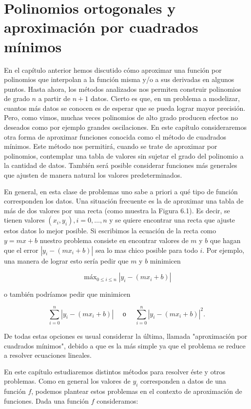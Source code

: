 \documentclass[10pt]{book}
\begin{document}
\chapter{Polinomios ortogonales y aproximación por cuadrados mínimos}
En el capítulo anterior hemos discutido cómo aproximar una función por polinomios que interpolan a la función misma y/o a sus derivadas en algunos puntos. Hasta ahora, los métodos analizados nos permiten construir polinomios de grado $n$ a partir de $n+1$ datos. Cierto es que, en un problema a modelizar, cuantos más datos se conocen es de esperar que se pueda lograr mayor precisión. Pero, como vimos, muchas veces polinomios de alto grado producen efectos no deseados como por ejemplo grandes oscilaciones. En este capítulo consideraremos otra forma de aproximar funciones conocida como el método de cuadrados mínimos. Este método nos permitirá, cuando se trate de aproximar por polinomios, contemplar una tabla de valores sin sujetar el grado del polinomio a la cantidad de datos. También será posible considerar funciones más generales que ajusten de manera natural los valores predeterminados.

En general, en esta clase de problemas uno sabe a priori a qué tipo de función corresponden los datos. Una situación frecuente es la de aproximar una tabla de más de dos valores por una recta (como muestra la Figura 6.1). Es decir, se tienen valores $\left(x_{i}, y_{i}\right), i=0, \ldots, n$ y se quiere encontrar una recta que ajuste estos datos lo mejor posible. Si escribimos la ecuación de la recta como $y=m x+b$ nuestro problema consiste en encontrar valores de $m$ y $b$ que hagan que el error $\left|y_{i}-\left(m x_{i}+b\right)\right|$ sea lo mas chico posible para todo $i$. Por ejemplo, una manera de lograr esto sería pedir que $m$ y $b$ minimicen

$$
\operatorname{máx}_{0 \leq i \leq n}\left|y_{i}-\left(m x_{i}+b\right)\right|
$$

o también podríamos pedir que minimicen

$$
\sum_{i=0}^{n}\left|y_{i}-\left(m x_{i}+b\right)\right| \quad \text { о } \quad \sum_{i=0}^{n}\left|y_{i}-\left(m x_{i}+b\right)\right|^{2} .
$$

De todas estas opciones es usual considerar la última, llamada "aproximación por cuadrados mínimos", debido a que es la más simple ya que el problema se reduce a resolver ecuaciones lineales.

En este capítulo estudiaremos distintos métodos para resolver éste y otros problemas. Como en general los valores de $y_{i}$ corresponden a datos de una función $f$, podemos plantear estos problemas en el contexto de aproximación de funciones. Dada una función $f$ consideramos:
\end{document}
